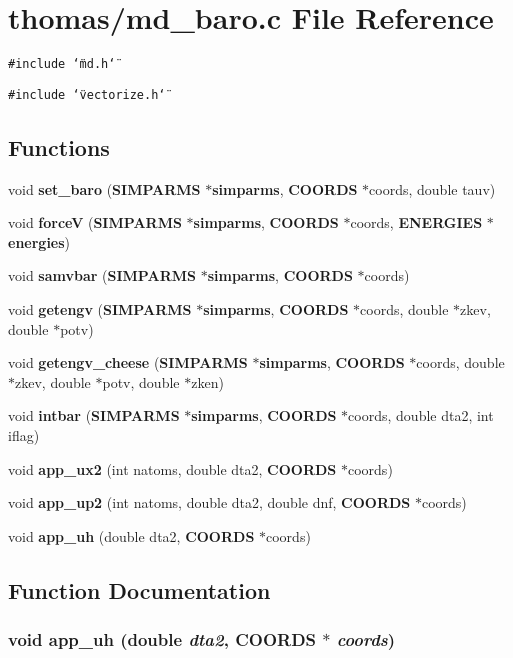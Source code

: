 \section{thomas/md\_\-baro.c File Reference}
\label{thomas_2md__baro_8c}
{\tt \#include \char`\"{}md.h\char`\"{}}\par
{\tt \#include \char`\"{}vectorize.h\char`\"{}}\par
\subsection*{Functions}
\begin{CompactItemize}
\item 
void {\bf set\_\-baro} ({\bf SIMPARMS} $\ast${\bf simparms}, {\bf COORDS} $\ast$coords, double tauv)
\item 
void {\bf force\-V} ({\bf SIMPARMS} $\ast${\bf simparms}, {\bf COORDS} $\ast$coords, {\bf ENERGIES} $\ast${\bf energies})
\item 
void {\bf samvbar} ({\bf SIMPARMS} $\ast${\bf simparms}, {\bf COORDS} $\ast$coords)
\item 
void {\bf getengv} ({\bf SIMPARMS} $\ast${\bf simparms}, {\bf COORDS} $\ast$coords, double $\ast$zkev, double $\ast$potv)
\item 
void {\bf getengv\_\-cheese} ({\bf SIMPARMS} $\ast${\bf simparms}, {\bf COORDS} $\ast$coords, double $\ast$zkev, double $\ast$potv, double $\ast$zken)
\item 
void {\bf intbar} ({\bf SIMPARMS} $\ast${\bf simparms}, {\bf COORDS} $\ast$coords, double dta2, int iflag)
\item 
void {\bf app\_\-ux2} (int natoms, double dta2, {\bf COORDS} $\ast$coords)
\item 
void {\bf app\_\-up2} (int natoms, double dta2, double dnf, {\bf COORDS} $\ast$coords)
\item 
void {\bf app\_\-uh} (double dta2, {\bf COORDS} $\ast$coords)
\end{CompactItemize}


\subsection{Function Documentation}
\subsubsection{\setlength{\rightskip}{0pt plus 5cm}void app\_\-uh (double {\em dta2}, {\bf COORDS} $\ast$ {\em coords})}\label{thomas_2md__baro_8c_db5bb2d6c57d2e3aa807d1c0e6114759}


